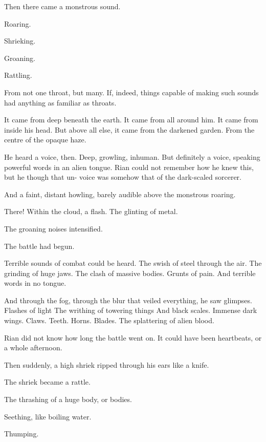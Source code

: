 \begin{garbage}
Then there came a monstrous sound. 

Roaring. 

Shrieking. 

Groaning. 

Rattling. 

From not one throat, but many. If, indeed, things capable of making such sounds had anything as familiar as throats. 

It came from deep beneath the earth. It came from all around him. It came from inside his head. But above all else, it came from the darkened garden. From the centre of the opaque haze. 

He heard a voice, then. Deep, growling, inhuman. But definitely a voice, speaking powerful words in an alien tongue. 
 Rian could not remember how he knew this, but he though that un-\scathaese{} voice was somehow that of the dark-scaled sorcerer. 

And a faint, distant howling, barely audible above the monstrous roaring. 

There! Within the cloud, a flash. The glinting of metal. 


The groaning noises intensified. 

The battle had begun. 

Terrible sounds of combat could be heard. 
The swish of steel through the air. 
The grinding of huge jaws. 
The clash of massive bodies. 
Grunts of pain. 
And terrible words in no \human{} tongue. 

And through the fog, through the blur that veiled everything, he saw glimpses. Flashes of light\prikker {} 
The writhing of towering things\prikker {}
And black scales. Immense dark wings. Claws. Teeth. Horns. Blades. 
The splattering of alien blood. 

Rian did not know how long the battle went on. It could have been heartbeats, or a whole afternoon.  

Then suddenly, a high shriek ripped through his ears like a knife. 

The shriek became a rattle. 

The thrashing of a huge body, or bodies.

Seething, like boiling water. 

Thumping. 


\end{garbage}

